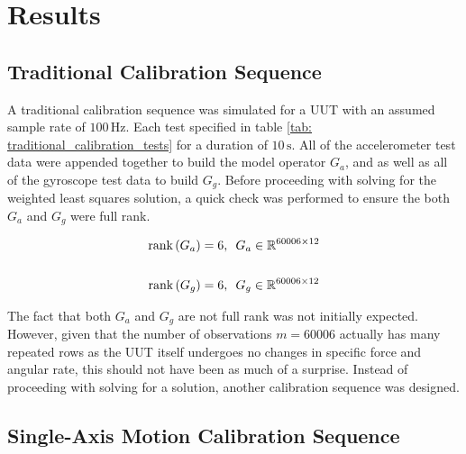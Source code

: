 
\begingroup
\allowdisplaybreaks

\section{Results}

\subsection{Traditional Calibration Sequence}

A traditional calibration sequence was simulated for a UUT with an assumed sample rate of $100 \,\unit{\hertz}$. Each test specified in table \ref{tab: traditional_calibration_tests} for a duration of $10 \,\unit{\second}$. All of the accelerometer test data were appended together to build the model operator $G_a$, and as well as all of the gyroscope test data to build $G_g$. Before proceeding with solving for the weighted least squares solution, a quick check was performed to ensure the both $G_a$ and $G_g$ were full rank. 

\begin{align}
	\textrm{rank}\left(G_a\right) &= 6,\,\,\, G_a \in \mathbb{R}^{60006 \times 12} \notag\\
	\\
	\textrm{rank}\left(G_g\right) &= 6,\,\,\, G_g \in \mathbb{R}^{60006 \times 12} \notag
\end{align}

The fact that both $G_a$ and $G_g$ are not full rank was not initially expected. However, given that the number of observations $m = 60006$ actually has many repeated rows as the UUT itself undergoes no changes in specific force and angular rate, this should not have been as much of a surprise. Instead of proceeding with solving for a solution, another calibration sequence was designed.








\subsection{Single-Axis Motion Calibration Sequence}

